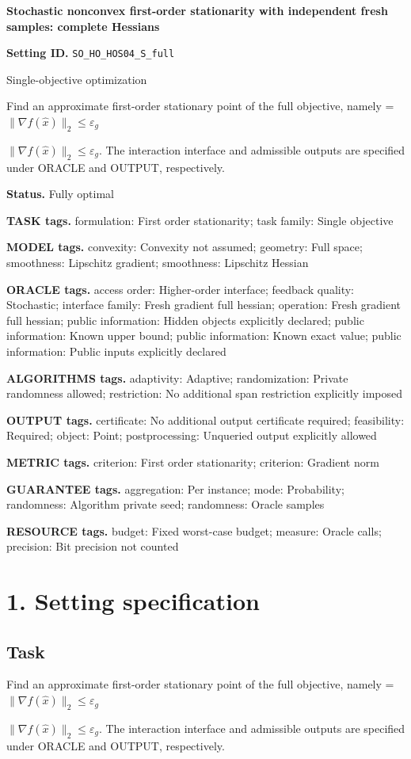 \documentclass[10pt,a4paper]{article}
\newcommand{\AtlasMath}[1]{\par\begingroup\centering\setbox0=\hbox{$\displaystyle #1$}\ifdim\wd0>1.4\linewidth\typeout{ATLAS WIDE FORMULA: \the\wd0}\fi\ifdim\wd0>\linewidth\resizebox{\linewidth}{!}{\box0}\else\box0\fi\par\endgroup}
\newcommand{\AtlasInlineMath}[1]{\begingroup\setbox0=\hbox{$#1$}\ifdim\wd0>.4\linewidth\endgroup\AtlasMath{#1}\else\endgroup$#1$\fi}
\begin{document}
\raggedright

{\LARGE\bfseries\sffamily\color{AtlasNavy} Stochastic nonconvex first-order stationarity with independent fresh samples: complete Hessians\par}\vspace{5pt}
\textbf{Setting ID.} \texttt{SO\_\allowbreak{}HO\_\allowbreak{}HOS04\_\allowbreak{}S\_\allowbreak{}full}

Single-objective optimization

Find an approximate first-order stationary point of the full objective, namely \AtlasInlineMath{\|\nabla f(\widehat{x})\|_2\le\varepsilon_g}. The interaction interface and admissible outputs are specified under ORACLE and OUTPUT, respectively.

\textbf{Status.} Fully optimal

\textbf{TASK tags.} formulation: First order stationarity; task family: Single objective

\textbf{MODEL tags.} convexity: Convexity not assumed; geometry: Full space; smoothness: Lipschitz gradient; smoothness: Lipschitz Hessian

\textbf{ORACLE tags.} access order: Higher-order interface; feedback quality: Stochastic; interface family: Fresh gradient full hessian; operation: Fresh gradient full hessian; public information: Hidden objects explicitly declared; public information: Known upper bound; public information: Known exact value; public information: Public inputs explicitly declared

\textbf{ALGORITHMS tags.} adaptivity: Adaptive; randomization: Private randomness allowed; restriction: No additional span restriction explicitly imposed

\textbf{OUTPUT tags.} certificate: No additional output certificate required; feasibility: Required; object: Point; postprocessing: Unqueried output explicitly allowed

\textbf{METRIC tags.} criterion: First order stationarity; criterion: Gradient norm

\textbf{GUARANTEE tags.} aggregation: Per instance; mode: Probability; randomness: Algorithm private seed; randomness: Oracle samples

\textbf{RESOURCE tags.} budget: Fixed worst-case budget; measure: Oracle calls; precision: Bit precision not counted

\section{1. Setting specification}
\subsection{Task}
Find an approximate first-order stationary point of the full objective, namely \AtlasInlineMath{\|\nabla f(\widehat{x})\|_2\le\varepsilon_g}. The interaction interface and admissible outputs are specified under ORACLE and OUTPUT, respectively.
\end{document}
